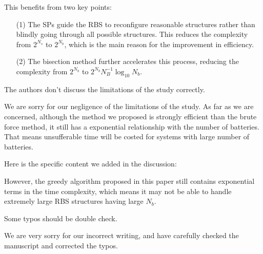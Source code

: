 \begin{revresponse}
\begin{changes}
This benefits from two key points:
\begin{enumerate}
\item[(1)] The SPs guide the RBS to reconfigure reasonable structures rather than blindly going through all possible structures. This reduces the complexity from $2^{N_s}$ to $2^{N_b}$, which is the main reason for the improvement in efficiency.
\item[(2)] The bisection method further accelerates this process, reducing the complexity from $2^{N_b}$ to $2^{N_b} N_B^{-1} \log_{10} N_b$.
\end{enumerate}
\end{changes}

\end{revresponse}

\begin{revcomment}
  The authors don't discuss the limitations of the study correctly.
\end{revcomment}
\begin{revresponse}

We are sorry for our negligence of the limitations of the study. 
As far as we are concerned, although the method we proposed is strongly efficient than the brute force method, it still has a exponential relationship with the number of batteries.
That means unsufferable time will be costed for systems with large number of batteries.


Here is the specific content we added in the discussion:
\begin{changes}
However, the greedy algorithm proposed in this paper still contains exponential terms in the time complexity, which means it may not be able to handle extremely large RBS structures having large $N_b$.
\end{changes}

\end{revresponse}


\begin{revcomment}
  Some typos should be double check.
\end{revcomment}
\begin{revresponse}

We are very sorry for our incorrect writing, and have carefully checked the manuscript and corrected the typos. 
  
\end{revresponse}

